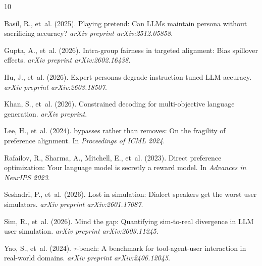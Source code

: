 \documentclass[11pt,a4paper]{article}
\begin{document}

\begin{thebibliography}{10}

Basil, R., et~al. (2025).
\newblock Playing pretend: Can {LLMs} maintain persona without sacrificing accuracy?
\newblock \emph{arXiv preprint arXiv:2512.05858}.

Gupta, A., et~al. (2026).
\newblock Intra-group fairness in targeted alignment: Bias spillover effects.
\newblock \emph{arXiv preprint arXiv:2602.16438}.

Hu, J., et~al. (2026).
\newblock Expert personas degrade instruction-tuned {LLM} accuracy.
\newblock \emph{arXiv preprint arXiv:2603.18507}.

Khan, S., et~al. (2026).
\newblock Constrained decoding for multi-objective language generation.
\newblock \emph{arXiv preprint}.

Lee, H., et~al. (2024).
 bypasses rather than removes: On the fragility of preference alignment.
\newblock In \emph{Proceedings of ICML 2024}.

Rafailov, R., Sharma, A., Mitchell, E., et~al. (2023).
\newblock Direct preference optimization: Your language model is secretly a reward model.
\newblock In \emph{Advances in NeurIPS 2023}.

Seshadri, P., et~al. (2026).
\newblock Lost in simulation: Dialect speakers get the worst user simulators.
\newblock \emph{arXiv preprint arXiv:2601.17087}.

Sim, R., et~al. (2026).
\newblock Mind the gap: Quantifying sim-to-real divergence in {LLM} user simulation.
\newblock \emph{arXiv preprint arXiv:2603.11245}.

Yao, S., et~al. (2024).
\newblock $\tau$-bench: A benchmark for tool-agent-user interaction in real-world domains.
\newblock \emph{arXiv preprint arXiv:2406.12045}.

\end{thebibliography}
\end{document}
